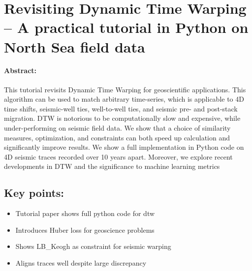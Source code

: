 \section[Dynamic Time Warping Tutorial Paper]{Revisiting Dynamic Time Warping -- A practical tutorial in Python on North Sea field data}

\paragraph{Abstract:} This tutorial revisits Dynamic Time Warping for geoscientific applications.  This algorithm can be used to match arbitrary time-series, which is applicable to 4D time shifts, seismic-well ties, well-to-well ties, and seismic pre- and post-stack migration.  DTW is notorious to be computationally slow and expensive, while under-performing on seismic field data.  We show that a choice of similarity measures, optimization, and constraints can both speed up calculation and significantly improve results.  We show a full implementation in Python code on 4D seismic traces recorded over 10 years apart. Moreover, we explore recent developments in DTW and the significance to machine learning metrics

\subsection*{Key points:}
\begin{itemize}
    \item Tutorial paper shows full python code for \acl{dtw}
    \item Introduces Huber loss for geoscience problems
    \item Shows LB\_Keogh as constraint for seismic warping
    \item Aligns traces well despite large discrepancy
\end{itemize}


{\vfill\hfill\newline{}}

